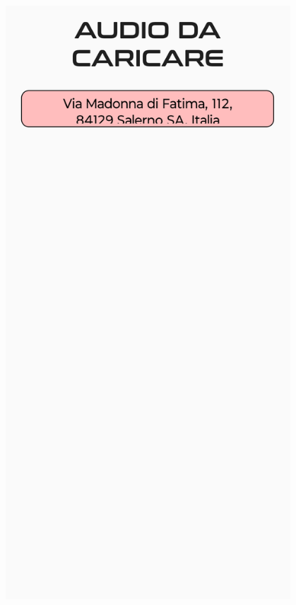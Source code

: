 \documentclass{article}
\begin{document}
\begin{minipage}[t]{0.35\textwidth}
    \centering
    \vspace*{20pt}
    \includegraphics[width=0.8\textwidth]{uploadlist.png}
\end{minipage}
\hfill
\end{document}
